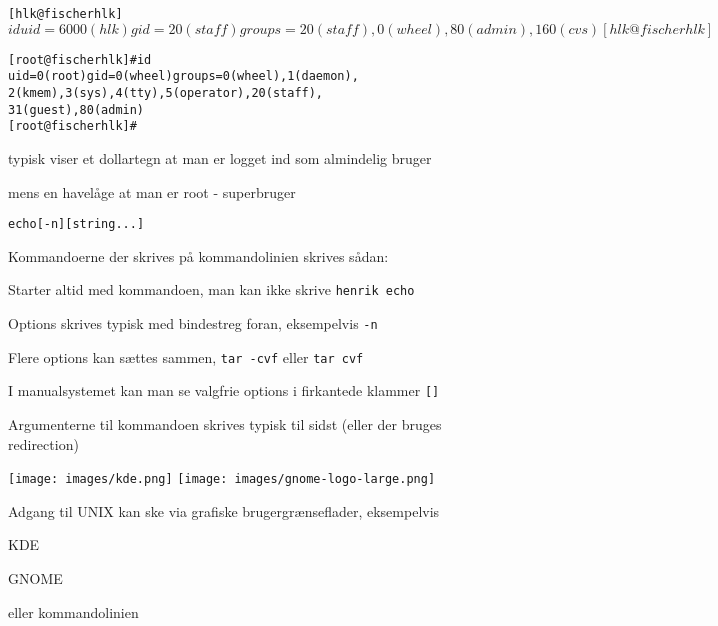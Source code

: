 \documentclass[Screen16to9,17pt]{foils}
\begin{document}


\begin{alltt}
\small
[hlk@fischer hlk]$ id
uid=6000(hlk) gid=20(staff) groups=20(staff),
0(wheel), 80(admin), 160(cvs)
[hlk@fischer hlk]$

[root@fischer hlk]# id
uid=0(root) gid=0(wheel) groups=0(wheel), 1(daemon),
2(kmem), 3(sys), 4(tty), 5(operator), 20(staff),
31(guest), 80(admin)
[root@fischer hlk]#
\end{alltt}

\begin{list1}
\item typisk viser et dollartegn at man er logget ind som almindelig bruger
\item mens en havelåge at man er root - superbruger
\end{list1}



\begin{alltt}
echo [-n] [string ...]
\end{alltt}

\begin{list1}
\item Kommandoerne der skrives på kommandolinien skrives sådan:
\begin{list2}
\item Starter altid med kommandoen, man kan ikke skrive \verb+henrik echo+
\item Options skrives typisk med bindestreg foran, eksempelvis \verb+-n+
\item Flere options kan sættes sammen, \verb+tar -cvf+ eller \verb+tar cvf+
\item I manualsystemet kan man se valgfrie options i firkantede
  klammer \verb+[]+
\item Argumenterne til kommandoen skrives typisk til sidst (eller der
  bruges redirection)
\end{list2}
\end{list1}



\begin{center}
\texttt{[image: images/kde.png]}
\texttt{[image: images/gnome-logo-large.png]}
\end{center}

\begin{list1}
\item Adgang til UNIX kan ske via grafiske brugergrænseflader, eksempelvis
  \begin{list2}
  \item KDE 
  \item GNOME 
  \end{list2}
\item eller kommandolinien
\end{list1}


\slidenext
\end{document}
